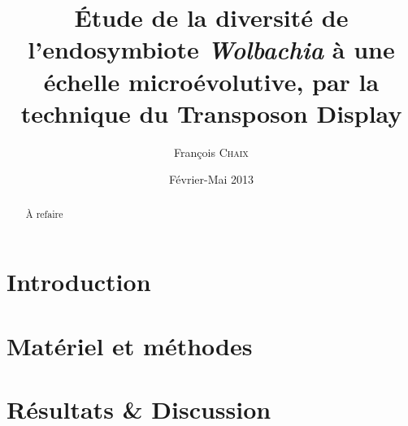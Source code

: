\documentclass[a4paper, 12pt, linktocpage=true, oneside]{memoir}
\title{Étude de la diversité de l’endosymbiote \textit{Wolbachia} à une échelle microévolutive, par la technique du Transposon Display}
\date{Février-Mai 2013}
\author{François \textsc{Chaix}}
\renewcommand{\baselinestretch}{1.5}
\begin{document}

\tableofcontents

\chapter{Introduction}


\chapter{Matériel et méthodes}


\chapter{Résultats \& Discussion}


\printbibliography

\newpage
\pagestyle{empty}
\renewcommand{\baselinestretch}{1} %
\begin{abstract}
À refaire
\end{abstract}
\end{document}
